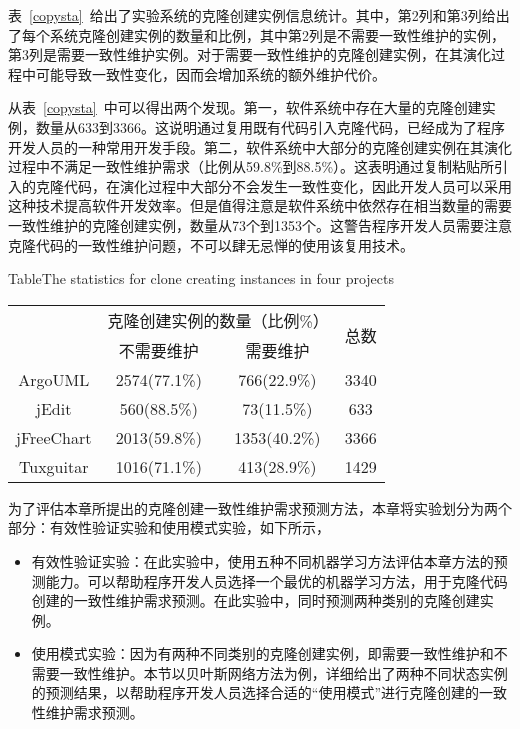 表~\ref{copysta}~给出了实验系统的克隆创建实例信息统计。其中，第2列和第3列给出了每个系统克隆创建实例的数量和比例，其中第2列是不需要一致性维护的实例，第3列是需要一致性维护实例。对于需要一致性维护的克隆创建实例，在其演化过程中可能导致一致性变化，因而会增加系统的额外维护代价。

从表~\ref{copysta}~中可以得出两个发现。第一，软件系统中存在大量的克隆创建实例，数量从633到3366。这说明通过复用既有代码引入克隆代码，已经成为了程序开发人员的一种常用开发手段。第二，软件系统中大部分的克隆创建实例在其演化过程中不满足一致性维护需求（比例从59.8\%到88.5\%）。这表明通过复制粘贴所引入的克隆代码，在演化过程中大部分不会发生一致性变化，因此开发人员可以采用这种技术提高软件开发效率。但是值得注意是软件系统中依然存在相当数量的需要一致性维护的克隆创建实例，数量从73个到1353个。这警告程序开发人员需要注意克隆代码的一致性维护问题，不可以肆无忌惮的使用该复用技术。

\begin{table}[htbp]
{Table$\!$}{The statistics for clone creating instances in four projects}
\vspace{0.5em}
\centering
\wuhao
\begin{tabular}{cccc}
\toprule[1.5pt]
~\multirow{2}{*}{实验系统}& \multicolumn{2}{c}{克隆创建实例的数量（比例\%）} & \multirow{2}{*}{总数}\\ 
 \cline{2-3}
~&{不需要维护} &{需要维护} & ~\\
\midrule[1pt]
ArgoUML&	2574(77.1\%)&	766(22.9\%)&	3340\\
jEdit&	560(88.5\%)&	73(11.5\%)&	633\\
jFreeChart&	2013(59.8\%)&	1353(40.2\%)&	3366\\
Tuxguitar&	1016(71.1\%)&	413(28.9\%)&	1429\\
\bottomrule[1.5pt]
\end{tabular}
\end{table}


为了评估本章所提出的克隆创建一致性维护需求预测方法，本章将实验划分为两个部分：有效性验证实验和使用模式实验，如下所示，
\begin{itemize}
\item
有效性验证实验：在此实验中，使用五种不同机器学习方法评估本章方法的预测能力。可以帮助程序开发人员选择一个最优的机器学习方法，用于克隆代码创建的一致性维护需求预测。在此实验中，同时预测两种类别的克隆创建实例。
\item
使用模式实验：因为有两种不同类别的克隆创建实例，即需要一致性维护和不需要一致性维护。本节以贝叶斯网络方法为例，详细给出了两种不同状态实例的预测结果，以帮助程序开发人员选择合适的“使用模式”进行克隆创建的一致性维护需求预测。
\end{itemize}


